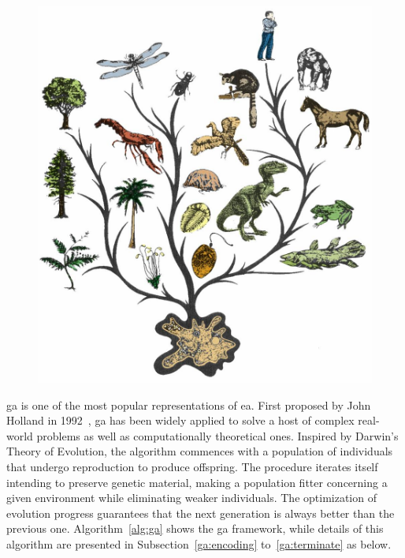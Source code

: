 \setlength{\intextsep}{3pt}
\renewcommand{\scalefigure}{0.4}
\begin{figure}[htbp]
	\centering
	\includegraphics[scale=\scalefigure]{Figures/chap 1/evolution-tree.jpg}
	\label{fig:evolution_tree}
\end{figure}
\bigskip
\acrfull{ga} is one of the most popular representations of \gls{ea}. First proposed by John Holland in 1992~\cite{holland1992genetic}, \gls{ga} has been widely applied to solve a host of complex real-world problems as well as computationally theoretical ones. Inspired by Darwin's Theory of Evolution, the algorithm commences with a population of individuals that undergo reproduction to produce offspring. The procedure iterates itself intending to preserve genetic material, making a population fitter concerning a given environment while eliminating weaker individuals. The optimization of evolution progress guarantees that the next generation is always better than the previous one. Algorithm~\ref{alg:ga} shows the \gls{ga} framework, while details of this algorithm are presented in Subsection~\ref{ga:encoding} to~\ref{ga:terminate} as below.

